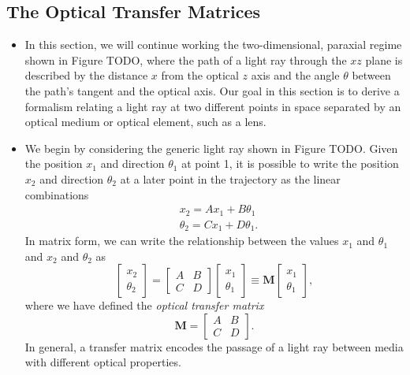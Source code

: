 \documentclass[11pt, a4paper]{article}
\newcommand{\mat}[1]{\mathbf{#1}} %
\begin{document}
\subsection{The Optical Transfer Matrices}
\begin{itemize}
    \item In this section, we will continue working the two-dimensional, paraxial regime shown in Figure TODO, where the path of a light ray through the $ xz $ plane is described by the distance $ x $ from the optical $ z $ axis and the angle $ \theta $ between the path's tangent and the optical axis. Our goal in this section is to derive a formalism relating a light ray at two different points in space separated by an optical medium or optical element, such as a lens.

    \item We begin by considering the generic light ray shown in Figure TODO. Given the position $ x_{1} $ and direction $ \theta_{1} $ at point 1, it is possible to write the position $ x_{2} $ and direction $ \theta_{2} $ at a later point in the trajectory as the linear combinations
    \begin{align}
        & x_{2} = Ax_{1} + B\theta_{1} \nonumber \\
        & \theta_{2} = Cx_{1} + D \theta_{1}. \label{eq:M-system}
    \end{align}
    In matrix form, we can write the relationship between the values $ x_{1} $ and $ \theta_{1} $ and $ x_{2} $ and $ \theta_{2} $ as
    \begin{equation}
        \begin{bmatrix}
            x_{2}\\
            \theta_{2}
        \end{bmatrix}
        = 
        \begin{bmatrix}
            A & B\\
            C & D
        \end{bmatrix}
        \begin{bmatrix}
            x_{1}\\
            \theta_{1}
        \end{bmatrix}
        \equiv \mat{M}
        \begin{bmatrix}
            x_{1}\\
            \theta_{1}
        \end{bmatrix}, \label{eq:M}
    \end{equation}
    where we have defined the \textit{optical transfer matrix}
    \begin{equation*}
        \mat{M} = 
        \begin{bmatrix}
            A & B\\
            C & D
        \end{bmatrix}.
    \end{equation*}
    In general, a transfer matrix encodes the passage of a light ray between media with different optical properties.

\end{itemize}
\end{document}
